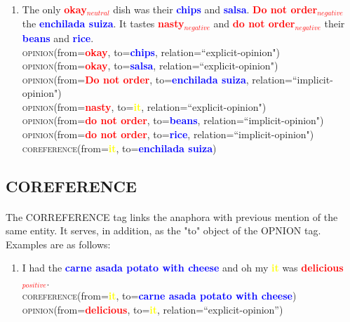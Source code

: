 \documentclass{article}
\begin{document}
\begin{enumerate}[resume]
\item The only \textbf{\textcolor{red}{okay$_{neutral}$}} dish was their \textbf{\textcolor{blue}{chips}} and \textbf{\textcolor{blue}{salsa}}. \textbf{\textcolor{red}{Do not order$_{negative}$}} the \textbf{\textcolor{blue}{enchilada suiza}}. It tastes \textbf{\textcolor{red}{nasty$_{negative}$}} and \textbf{\textcolor{red}{do not order$_{negative}$}} their \textbf{\textcolor{blue}{beans}} and \textbf{\textcolor{blue}{rice}}. \\
\textsc{opinion}(from=\textbf{\textcolor{red}{okay}}, to=\textbf{\textcolor{blue}{chips}}, relation=``explicit-opinion")\\
\textsc{opinion}(from=\textbf{\textcolor{red}{okay}}, to=\textbf{\textcolor{blue}{salsa}}, relation=``explicit-opinion")\\
\textsc{opinion}(from=\textbf{\textcolor{red}{Do not order}}, to=\textbf{\textcolor{blue}{enchilada suiza}}, relation=``implicit-opinion")\\
\textsc{opinion}(from=\textbf{\textcolor{red}{nasty}}, to=\textbf{\textcolor{yellow}{it}}, relation=``explicit-opinion")\\
\textsc{opinion}(from=\textbf{\textcolor{red}{do not order}}, to=\textbf{\textcolor{blue}{beans}}, relation=``implicit-opinion")\\
\textsc{opinion}(from=\textbf{\textcolor{red}{do not order}}, to=\textbf{\textcolor{blue}{rice}}, relation=``implicit-opinion")\\
\textsc{coreference}(from=\textbf{\textcolor{yellow}{it}}, to=\textbf{\textcolor{blue}{enchilada suiza}})
\end{enumerate}



\subsection{COREFERENCE}
\paragraph{}
The CORREFERENCE tag links the anaphora with previous mention of the same entity. It serves, in addition, as the "to" object of the OPNION tag. Examples are as follows:

\begin{enumerate}[resume]
	\item I had the \textbf{\textcolor{blue}{carne asada potato with cheese}} and oh my \textbf{\textcolor{yellow}{it}} was \textbf{\textcolor{red}{delicious$_{positive}$}}.\\
	\textsc{coreference}(from=\textbf{\textcolor{yellow}{it}}, to=\textbf{\textcolor{blue}{carne asada potato with cheese}})\\
		\textsc{opinion}(from=\textbf{\textcolor{red}{delicious}}, to=\textbf{\textcolor{yellow}{it}}, relation=``explicit-opinion'')\\
\end{enumerate}
\end{document}
